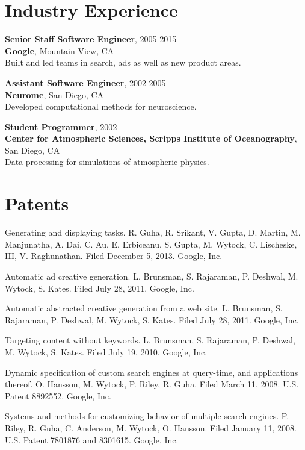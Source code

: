 \documentclass[margin, line]{res}
\begin{document}
\begin{resume}
\section{Industry Experience}

{\bf Senior Staff Software Engineer}, 2005-2015 \\
{\bf Google}, Mountain View, CA \\
Built and led teams in search, ads as well as new product areas.

{\bf Assistant Software Engineer}, 2002-2005 \\
{\bf Neurome}, San Diego, CA \\
Developed computational methods for neuroscience.

{\bf Student Programmer}, 2002 \\
{\bf Center for Atmospheric Sciences, Scripps Institute of Oceanography}, San
Diego, CA \\
Data processing for simulations of atmospheric physics.

\section{Patents}

Generating and displaying tasks. R. Guha, R. Srikant, V. Gupta, D. Martin,
M. Manjunatha, A. Dai, C. Au,  E. Erbiceanu, S. Gupta, M. Wytock, C. Lischeske,
III, V. Raghunathan. Filed December 5, 2013. Google, Inc.

Automatic ad creative generation. L. Brunsman, S. Rajaraman, P. Deshwal,
M. Wytock, S. Kates. Filed July 28, 2011. Google, Inc.

Automatic abstracted creative generation from a web site. L. Brunsman,
S. Rajaraman, P. Deshwal, M. Wytock, S. Kates. Filed July 28, 2011. Google, Inc.

Targeting content without keywords. L. Brunsman, S. Rajaraman, P. Deshwal,
M. Wytock, S. Kates. Filed July 19, 2010. Google, Inc.

Dynamic specification of custom search engines at query-time, and applications
thereof. O. Hansson, M. Wytock, P. Riley, R. Guha. Filed March 11,
2008. U.S. Patent 8892552. Google, Inc.

Systems and methods for customizing behavior of multiple search
engines. P. Riley, R. Guha, C. Anderson, M. Wytock, O. Hansson. Filed January
11, 2008. U.S. Patent 7801876 and 8301615. Google, Inc.

\end{resume}
\end{document}
